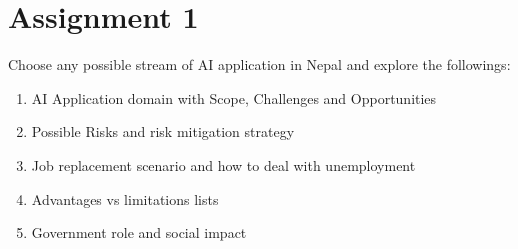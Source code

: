 \section{Assignment 1}
\label{sec:assignment1}
\begin{exercise}
Choose any possible stream of AI application in Nepal and explore the
followings:
\begin{enumerate}
  \item AI Application domain with Scope, Challenges and Opportunities
  \item Possible Risks and risk mitigation strategy
  \item Job replacement scenario and how to deal with unemployment
  \item Advantages vs limitations lists
  \item Government role and social impact

\end{enumerate}
\end{exercise}

